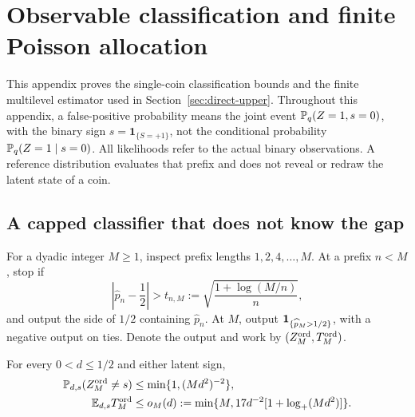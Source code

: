\section{Observable classification and finite Poisson allocation}
\label{sec:uf-foundations}
This appendix proves the single-coin classification bounds and the
finite multilevel estimator used in Section~\ref{sec:direct-upper}.
Throughout this appendix, a false-positive probability means the joint
event $\mathbb P_q(Z=1,s=0)$, with the binary sign $s=\mathbf1_{\{S=+1\}}$, not the conditional
probability $\mathbb P_q(Z=1\mid s=0)$. All likelihoods
refer to the actual binary observations. A reference distribution evaluates
that prefix and does not reveal or redraw the latent state of a coin.

\subsection{A capped classifier that does not know the gap}

For a dyadic integer $M\ge1$, inspect prefix lengths
$1,2,4,\ldots,M$. At a prefix $n<M$, stop if
\[
 \left|\widehat p_n-\frac12\right|>
 t_{n,M}:=\sqrt{\frac{1+\log(M/n)}{n}},
\]
and output the side of $1/2$ containing $\widehat p_n$. At $M$, output
$\mathbf 1_{\{\widehat p_M>1/2\}}$, with a negative output on ties.
Denote the output and work by $(Z_M^{\rm ord},T_M^{\rm ord})$.

\begin{lemma}\label{lem:uf-ordinary}
For every $0<d\le1/2$ and either latent sign,
\begin{align}
 \mathbb P_{d,s}(Z_M^{\rm ord}\ne s)
 &\le \min\{1,(Md^2)^{-2}\},\label{eq:uf-ordinary-error}\\
 \mathbb E_{d,s}T_M^{\rm ord}
 &\le o_M(d):=\min\{M,17d^{-2}[1+\log_+(Md^2)]\}.
 \label{eq:uf-ordinary-work}
\end{align}
\end{lemma}

